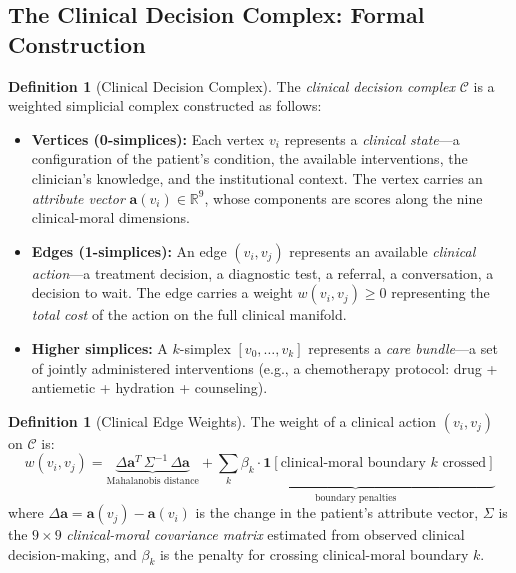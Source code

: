 \documentclass[12pt]{article}
\theoremstyle{definition}
\newtheorem{definition}[theorem]{Definition}
\theoremstyle{remark}
\newcommand{\C}{\mathcal{C}}               %
\newcommand{\R}{\mathbb{R}}
\begin{document}
\subsection{The Clinical Decision Complex: Formal Construction}

\begin{definition}[Clinical Decision Complex]
\label{def:clinical_complex}
The \emph{clinical decision complex} $\C$ is a weighted simplicial complex constructed as follows:
\begin{itemize}
    \item \textbf{Vertices (0-simplices):} Each vertex $v_i$ represents a \emph{clinical state}---a configuration of the patient's condition, the available interventions, the clinician's knowledge, and the institutional context.  The vertex carries an \emph{attribute vector} $\mathbf{a}(v_i) \in \R^9$, whose components are scores along the nine clinical-moral dimensions.
    \item \textbf{Edges (1-simplices):} An edge $(v_i, v_j)$ represents an available \emph{clinical action}---a treatment decision, a diagnostic test, a referral, a conversation, a decision to wait.  The edge carries a weight $w(v_i, v_j) \geq 0$ representing the \emph{total cost} of the action on the full clinical manifold.
    \item \textbf{Higher simplices:} A $k$-simplex $[v_0, \ldots, v_k]$ represents a \emph{care bundle}---a set of jointly administered interventions (e.g., a chemotherapy protocol: drug + antiemetic + hydration + counseling).
\end{itemize}
\end{definition}

\begin{definition}[Clinical Edge Weights]
\label{def:clinical_weights}
The weight of a clinical action $(v_i, v_j)$ on $\C$ is:
\begin{equation}
w(v_i, v_j) = \underbrace{\Delta \mathbf{a}^T\, \Sigma^{-1}\, \Delta \mathbf{a}}_{\text{Mahalanobis distance}} + \underbrace{\sum_k \beta_k \cdot \mathbf{1}[\text{clinical-moral boundary } k \text{ crossed}]}_{\text{boundary penalties}}
\label{eq:clinical_weight}
\end{equation}
where $\Delta \mathbf{a} = \mathbf{a}(v_j) - \mathbf{a}(v_i)$ is the change in the patient's attribute vector, $\Sigma$ is the $9 \times 9$ \emph{clinical-moral covariance matrix} estimated from observed clinical decision-making, and $\beta_k$ is the penalty for crossing clinical-moral boundary $k$.
\end{definition}
\end{document}
